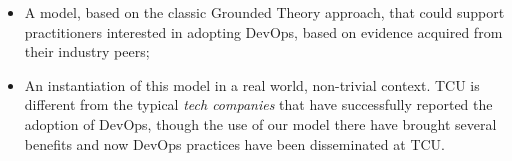 \begin{itemize}
\item A model, based on the classic Grounded Theory approach, that could support practitioners interested in adopting DevOps,
      based on evidence acquired from their industry peers;
\item An instantiation of this model in a real world, non-trivial context. TCU is different from the typical \emph{tech companies}
that have successfully reported the adoption of DevOps, though the use of our model there have brought several benefits and
now DevOps practices have been disseminated at TCU.
\end{itemize}









%



